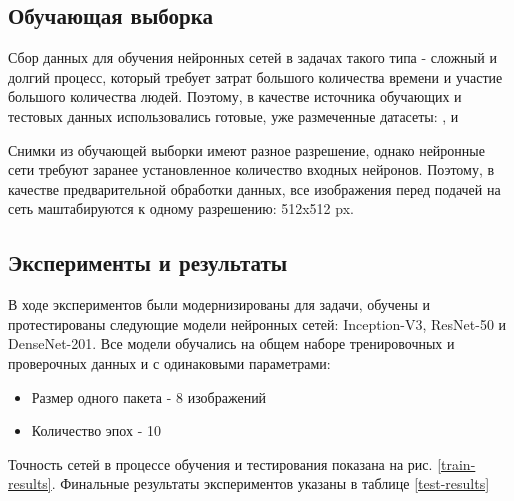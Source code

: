 \subsection{Обучающая выборка}
Сбор данных для обучения нейронных сетей в задачах такого типа - сложный и долгий процесс, который требует затрат большого количества времени и участие большого количества людей. Поэтому, в качестве источника обучающих и тестовых данных использовались готовые, уже размеченные датасеты: \cite{tawsifurrahman}, \cite{cohen2020covid} и \cite{wang2020covidnet}

Снимки из обучающей выборки имеют разное разрешение, однако нейронные сети требуют заранее установленное количество входных нейронов. Поэтому, в качестве предварительной обработки данных, все изображения перед подачей на сеть маштабируются к одному разрешению: 512x512 px.

\subsection{Эксперименты и результаты}
В ходе экспериментов были модернизированы для задачи, обучены и протестированы следующие модели нейронных сетей: Inception-V3, ResNet-50 и DenseNet-201. Все модели обучались на общем наборе тренировочных и проверочных данных и с одинаковыми параметрами:
\begin{itemize}
    \item Размер одного пакета - 8 изображений
    \item Количество эпох - 10
\end{itemize}
Точность сетей в процессе обучения и тестирования показана на рис. \ref{train-results}. Финальные результаты экспериментов указаны в таблице \ref{test-results}




\clearpage
